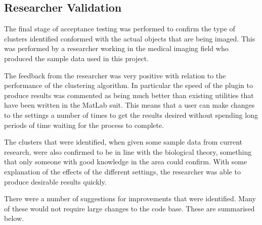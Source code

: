 \subsection{Researcher Validation}
\label{sub:researcher_validation}

The final stage of acceptance testing was performed to confirm the type of
clusters identified conformed with the actual objects that are being imaged.
This was performed by a researcher working in the medical imaging field who
produced the sample data used in this project.

The feedback from the researcher was very positive with relation to the
performance of the clustering algorithm. In particular the speed of the plugin
to produce results was commented as being much better than existing utilities
that have been written in the MatLab suit\cite{matlab2010}. This means that a
user can make changes to the settings a number of times to get the results
desired without spending long periods of time waiting for the process to
complete.

The clusters that were identified, when given some sample data from current
research, were also confirmed to be in line with the biological theory,
something that only someone with good knowledge in the area could confirm. With
some explanation of the effects of the different settings, the researcher was
able to produce desirable results quickly.

There were a number of suggestions for improvements that were identified. Many
of these would not require large changes to the code base. These are summarised
below.

